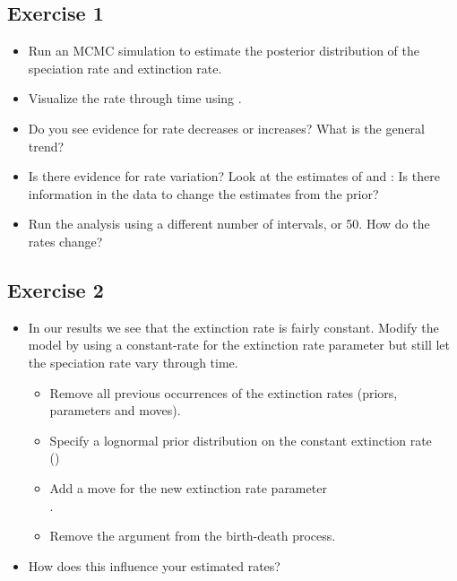 \subsection{Exercise 1}

\begin{itemize}
\item Run an MCMC simulation to estimate the posterior distribution of the speciation rate and extinction rate.
\item Visualize the rate through time using \R.
\item Do you see evidence for rate decreases or increases? What is the general trend?
\item Is there evidence for rate variation? Look at the estimates of  and : Is there information in the data to change the estimates from the prior?
\item Run the analysis using a different number of intervals,  or 50. How do the rates change?
\end{itemize}


\subsection{Exercise 2}

\begin{itemize}
\item In our results we see that the extinction rate is fairly constant. Modify the model by using a constant-rate for the extinction rate parameter but still let the speciation rate vary through time.
\begin{itemize}
\item Remove all previous occurrences of the extinction rates (\IE priors, parameters and moves).
\item Specify a lognormal prior distribution on the constant extinction rate \\()
\item Add a move for the new extinction rate parameter \\.
\item Remove the argument  from the birth-death process.
\end{itemize}
\item How does this influence your estimated rates?
\end{itemize}





